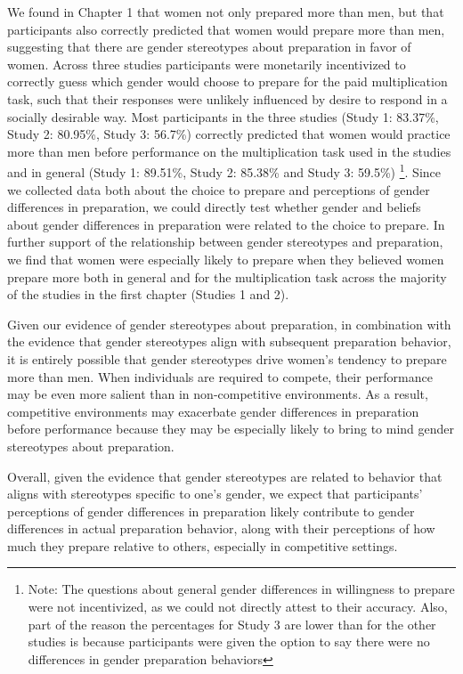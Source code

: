 \documentclass[letterpaper, nobind]{templates/ociamthesis}
\begin{document}
We found in Chapter 1 that women not only prepared more than men, but that participants also correctly predicted that women would prepare more than men, suggesting that there are gender stereotypes about preparation in favor of women. Across three studies participants were monetarily incentivized to correctly guess which gender would choose to prepare for the paid multiplication task, such that their responses were unlikely influenced by desire to respond in a socially desirable way. Most participants in the three studies (Study 1: 83.37\%, Study 2: 80.95\%, Study 3: 56.7\%) correctly predicted that women would practice more than men before performance on the multiplication task used in the studies and in general (Study 1: 89.51\%, Study 2: 85.38\% and Study 3: 59.5\%) \footnote{Note: The questions about general gender differences in willingness to prepare were not incentivized, as we could not directly attest to their accuracy. Also, part of the reason the percentages for Study 3 are lower than for the other studies is because participants were given the option to say there were no differences in gender preparation behaviors}. Since we collected data both about the choice to prepare and perceptions of gender differences in preparation, we could directly test whether gender and beliefs about gender differences in preparation were related to the choice to prepare. In further support of the relationship between gender stereotypes and preparation, we find that women were especially likely to prepare when they believed women prepare more both in general and for the multiplication task across the majority of the studies in the first chapter (Studies 1 and 2).

Given our evidence of gender stereotypes about preparation, in combination with the evidence that gender stereotypes align with subsequent preparation behavior, it is entirely possible that gender stereotypes drive women's tendency to prepare more than men. When individuals are required to compete, their performance may be even more salient than in non-competitive environments. As a result, competitive environments may exacerbate gender differences in preparation before performance because they may be especially likely to bring to mind gender stereotypes about preparation.

Overall, given the evidence that gender stereotypes are related to behavior that aligns with stereotypes specific to one's gender, we expect that participants' perceptions of gender differences in preparation likely contribute to gender differences in actual preparation behavior, along with their perceptions of how much they prepare relative to others, especially in competitive settings.
\end{document}
